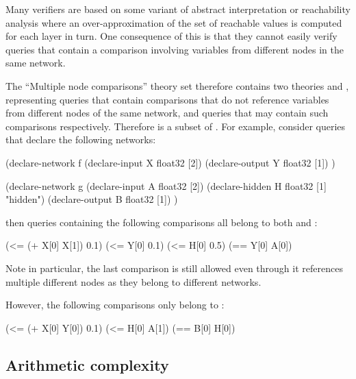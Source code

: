 Many verifiers are based on some variant of abstract interpretation or reachability analysis where an over-approximation of the set of reachable values is computed for each layer in turn.
One consequence of this is that they cannot easily verify queries that contain a comparison involving variables from different nodes in the same network.

The ``Multiple node comparisons'' theory set therefore contains two theories \snc{} and \mnc{}, representing queries that contain comparisons that do not reference variables from different nodes of the same network, and queries that may contain such comparisons respectively. Therefore \snc{} is a subset of \mnc{}. For example, consider queries that declare the following networks:

\begin{code}[style=lbnf]
(declare-network f
    (declare-input  X float32 [2])
    (declare-output Y float32 [1])
)

(declare-network g
    (declare-input  A float32 [2])
    (declare-hidden H float32 [1] "hidden")
    (declare-output B float32 [1])
)
\end{code}

\noindent then queries containing the following comparisons all belong to both \snc{} and \mnc{}:

\begin{code}[style=lbnf]
(<= (+ X[0] X[1]) 0.1)
(<= Y[0] 0.1)
(<= H[0] 0.5)
(== Y[0] A[0])
\end{code}

\noindent Note in particular, the last comparison is still allowed even through it references multiple different nodes as they belong to different networks. 

However, the following comparisons only belong to \mnc{}:

\begin{code}[style=lbnf]
(<= (+ X[0] Y[0]) 0.1)
(<= H[0] A[1])
(== B[0] H[0])
\end{code}

\subsection{Arithmetic complexity}
\label{sec:arithmetic-complexity}

